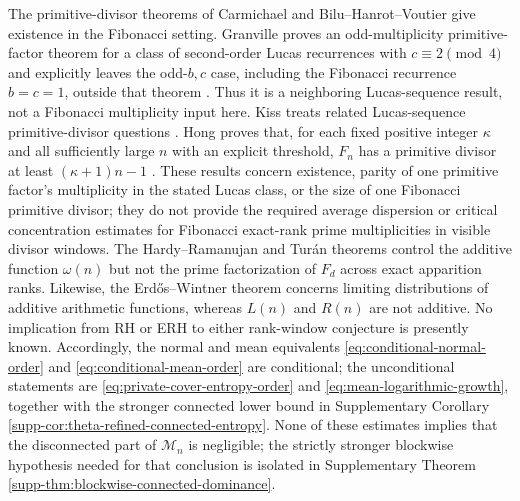 \begin{remark}
The primitive-divisor theorems of Carmichael and Bilu--Hanrot--Voutier give
existence in the Fibonacci setting. Granville proves an odd-multiplicity
primitive-factor theorem for a class of second-order Lucas recurrences with
$c\equiv2\pmod4$ and explicitly leaves the odd-$b,c$ case, including the
Fibonacci recurrence $b=c=1$, outside that theorem
\cite{Granville2012PrimitivePrimeFactors}. Thus it is a neighboring
Lucas-sequence result, not a Fibonacci multiplicity input here. Kiss treats
related Lucas-sequence primitive-divisor questions
\cite{Kiss1988PrimitiveDivisors}. Hong proves that, for each fixed positive
integer $\kappa$ and all sufficiently large $n$ with an explicit threshold,
$F_n$ has a primitive divisor at least $(\kappa+1)n-1$
\cite{Hong2025BigPrimitiveDivisors}. These results concern existence, parity of
one primitive factor's multiplicity in the stated Lucas class, or the size of
one Fibonacci primitive divisor; they do not provide the required average
dispersion or critical concentration estimates for Fibonacci exact-rank prime
multiplicities in visible divisor windows. The
Hardy--Ramanujan and
Tur\'an theorems control the additive function $\omega(n)$ but not the prime
factorization of $F_d$ across exact apparition ranks. Likewise, the
Erd\H{o}s--Wintner theorem \cite{ErdosWintner1939Additive} concerns limiting
distributions of additive arithmetic functions, whereas $L(n)$ and $R(n)$
are not additive. No implication from RH or ERH to either rank-window
conjecture is presently known. Accordingly, the normal and mean equivalents
\eqref{eq:conditional-normal-order} and
\eqref{eq:conditional-mean-order} are conditional; the unconditional
statements are \eqref{eq:private-cover-entropy-order} and
\eqref{eq:mean-logarithmic-growth}, together with the stronger connected lower
bound in Supplementary Corollary~
\ref{supp-cor:theta-refined-connected-entropy}.
None of these estimates implies that the disconnected part of $\mathcal M_n$
is negligible; the strictly stronger blockwise hypothesis needed for that
conclusion is isolated in Supplementary Theorem~
\ref{supp-thm:blockwise-connected-dominance}.
\end{remark}

